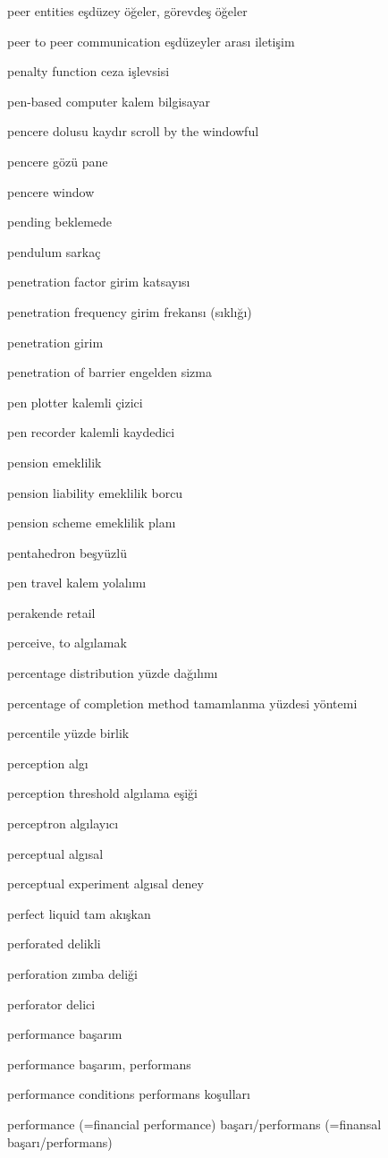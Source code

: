 \documentclass[12pt,fleqn]{article}\usepackage{../../common}
\begin{document}
peer entities eşdüzey öğeler, görevdeş öğeler

peer to peer communication eşdüzeyler arası iletişim

penalty function ceza işlevsisi

pen-based computer kalem bilgisayar

pencere dolusu kaydır scroll by the windowful

pencere gözü pane

pencere window

pending beklemede

pendulum sarkaç

penetration factor girim katsayısı

penetration frequency girim frekansı (sıklığı)

penetration girim

penetration of barrier engelden sizma

pen plotter kalemli çizici

pen recorder kalemli kaydedici

pension emeklilik

pension liability emeklilik borcu

pension scheme emeklilik planı

pentahedron beşyüzlü

pen travel kalem yolalımı

perakende retail

perceive, to algılamak

percentage distribution yüzde dağılımı

percentage of completion method tamamlanma yüzdesi yöntemi

percentile yüzde birlik

perception algı

perception threshold algılama eşiği

perceptron algılayıcı

perceptual algısal

perceptual experiment algısal deney

perfect liquid tam akışkan

perforated delikli

perforation zımba deliği

perforator delici

performance başarım

performance başarım, performans

performance conditions performans koşulları

performance (=financial performance) başarı/performans (=finansal başarı/performans)
\end{document}
